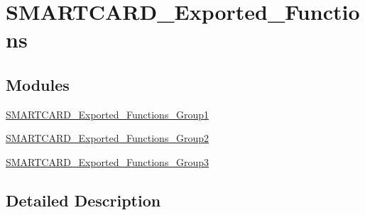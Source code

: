 \hypertarget{group___s_m_a_r_t_c_a_r_d___exported___functions}{}\section{S\+M\+A\+R\+T\+C\+A\+R\+D\+\_\+\+Exported\+\_\+\+Functions}
\label{group___s_m_a_r_t_c_a_r_d___exported___functions}
\subsection*{Modules}
\begin{DoxyCompactItemize}
\item 
\hyperlink{group___s_m_a_r_t_c_a_r_d___exported___functions___group1}{S\+M\+A\+R\+T\+C\+A\+R\+D\+\_\+\+Exported\+\_\+\+Functions\+\_\+\+Group1}
\item 
\hyperlink{group___s_m_a_r_t_c_a_r_d___exported___functions___group2}{S\+M\+A\+R\+T\+C\+A\+R\+D\+\_\+\+Exported\+\_\+\+Functions\+\_\+\+Group2}
\item 
\hyperlink{group___s_m_a_r_t_c_a_r_d___exported___functions___group3}{S\+M\+A\+R\+T\+C\+A\+R\+D\+\_\+\+Exported\+\_\+\+Functions\+\_\+\+Group3}
\end{DoxyCompactItemize}


\subsection{Detailed Description}
